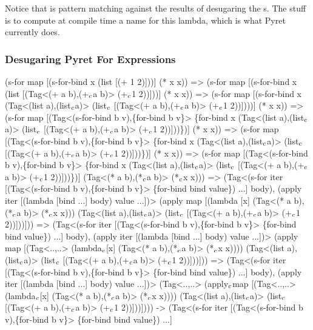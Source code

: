 Notice that  is pattern matching against the results of
desugaring the s. The  stuff is to
compute at compile time a name for this lambda, which is what Pyret
currently does.

\newcommand{\C}{\(\sb{c}\)}
\subsubsection{Desugaring Pyret For Expressions}
\begin{Codes}
   (s-for map
     [(s-for-bind x (list [(+ 1 2)]))]
     (* x x))
=> (s-for map [(s-for-bind x (list
     [(Tag<(+ a b),(+\C a b)> (+\C 1 2))]))] (* x x))
=> (s-for map [(s-for-bind x (Tag<(list a),(list\C a)> (list\C
     [(Tag<(+ a b),(+\C a b)> (+\C 1 2))])))] (* x x))
=> (s-for map
     [(Tag<(s-for-bind b v),\{for-bind b v\}> \{for-bind x
       (Tag<(list a),(list\C a)> (list\C
         [(Tag<(+ a b),(+\C a b)> (+\C 1 2))]))\})] (* x x))
=> (s-for map
     [(Tag<(s-for-bind b v),\{for-bind b v\}> \{for-bind x
       (Tag<(list a),(list\C a)> (list\C
         [(Tag<(+ a b),(+\C a b)> (+\C 1 2))]))\})] (* x x))
=> (s-for map
     [(Tag<(s-for-bind b v),\{for-bind b v\}> \{for-bind x
       (Tag<(list a),(list\C a)> (list\C
         [(Tag<(+ a b),(+\C a b)> (+\C 1 2))]))\})]
     (Tag<(* a b),(*\C a b)>
       (*\C x x)))
=> (Tag<(s-for iter
         [(Tag<(s-for-bind b v),\{for-bind b v\}>
             \{for-bind bind value\}) ...]
           body),
         (apply iter [(lambda [bind ...] body) value ...])>
      (apply map [(lambda [x] (Tag<(* a b),(*\C a b)> (*\C x x)))
        (Tag<(list a),(list\C a)> (list\C
          [(Tag<(+ a b),(+\C a b)> (+\C 1 2))]))]))
=> (Tag<(s-for iter
         [(Tag<(s-for-bind b v),\{for-bind b v\}>
             \{for-bind bind value\}) ...]
           body),
         (apply iter [(lambda [bind ...] body) value ...])>
      (apply map [(Tag<..,..> (lambda\C [x]
          (Tag<(* a b),(*\C a b)> (*\C x x))))
        (Tag<(list a),(list\C a)> (list\C
          [(Tag<(+ a b),(+\C a b)> (+\C 1 2))]))]))
=> (Tag<(s-for iter
         [(Tag<(s-for-bind b v),\{for-bind b v\}>
             \{for-bind bind value\}) ...]
           body),
         (apply iter [(lambda [bind ...] body) value ...])>
      (Tag<..,..> (apply\C map [(Tag<..,..>(lambda\C [x]
          (Tag<(* a b),(*\C a b)> (*\C x x))))
        (Tag<(list a),(list\C a)> (list\C
          [(Tag<(+ a b),(+\C a b)> (+\C 1 2))]))])))
-> (Tag<(s-for iter
         [(Tag<(s-for-bind b v),\{for-bind b v\}>
             \{for-bind bind value\}) ...]

\end{Codes}
